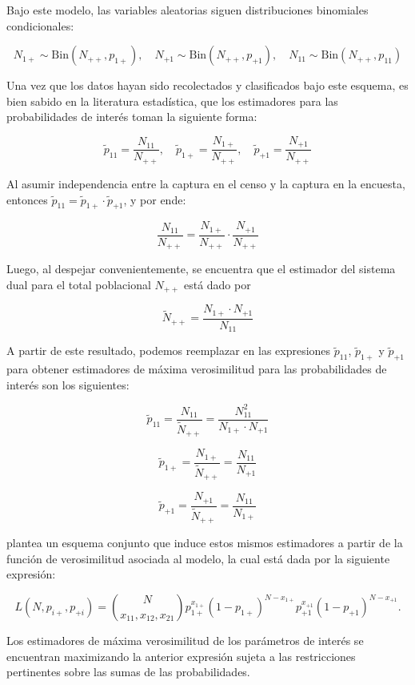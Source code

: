 \documentclass[
  12pt,
]{book}
\begin{document}
Bajo este modelo, las variables aleatorias siguen distribuciones binomiales condicionales:

\[
N_{1+} \sim \text{Bin}(N_{++}, p_{1+}), \quad N_{+1} \sim \text{Bin}(N_{++}, p_{+1}), \quad N_{11} \sim \text{Bin}(N_{++}, p_{11})
\]

Una vez que los datos hayan sido recolectados y clasificados bajo este esquema, es bien sabido en la literatura estadística, que los estimadores para las probabilidades de interés toman la siguiente forma:

\[
\tilde p_{11} = \frac{N_{11}}{N_{++}},  \quad 
\tilde p_{1+} = \frac{N_{1+}}{N_{++}},  \quad 
\tilde p_{+1} = \frac{N_{+1}}{N_{++}}
\]

Al asumir independencia entre la captura en el censo y la captura en la encuesta, entonces \(\tilde p_{11} = \tilde p_{1+} \cdot \tilde p_{+1}\), y por ende:

\[
\frac{N_{11}}{N_{++}} = \frac{N_{1+}}{N_{++}} \cdot \frac{N_{+1}}{N_{++}}
\]

Luego, al despejar convenientemente, se encuentra que el estimador del sistema dual para el total poblacional \(N_{++}\) está dado por

\[
\tilde N_{++} = \frac{N_{1+} \cdot N_{+1}}{N_{11}} 
\]

A partir de este resultado, podemos reemplazar en las expresiones \(\tilde p_{11}\), \(\tilde p_{1+}\) y \(\tilde p_{+1}\) para obtener estimadores de máxima verosimilitud para las probabilidades de interés son los siguientes:

\[
\tilde p_{11} = \frac{N_{11}}{\tilde N_{++}} = \frac{N_{11}^2}{N_{1+} \cdot N_{+1}}
\]

\[
\tilde p_{1+} = \frac{N_{1+}}{\tilde N_{++}} = \frac{N_{11}}{N_{+1}}
\]

\[
\tilde p_{+1} = \frac{N_{+1}}{\tilde N_{++}} = \frac{N_{11}}{N_{1+}}
\]

\citet[sección 2.4]{wolter1986coverage} plantea un esquema conjunto que induce estos mismos estimadores a partir de la función de verosimilitud asociada al modelo, la cual está dada por la siguiente expresión:

\[
L(N, p_{i+}, p_{+i}) = \binom{N}{x_{11}, x_{12}, x_{21}} p_{1+}^{x_{1+}} (1 - p_{1+})^{N - x_{1+}} p_{+1}^{x_{+1}} (1 - p_{+1})^{N - x_{+1}}.
\]

Los estimadores de máxima verosimilitud de los parámetros de interés se encuentran maximizando la anterior expresión sujeta a las restricciones pertinentes sobre las sumas de las probabilidades.
\end{document}
